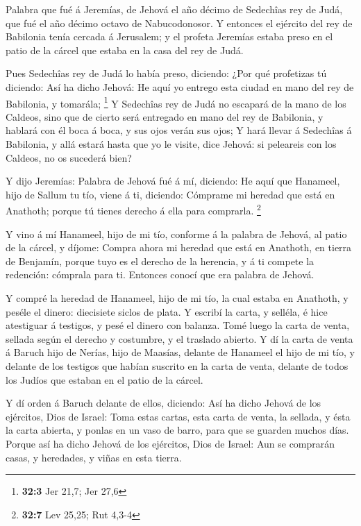  Palabra que fué á Jeremías, de Jehová el año décimo de
Sedechîas rey de Judá, que fué el año décimo octavo de Nabucodonosor.
 Y entonces el ejército del rey de Babilonia tenía cercada
á Jerusalem; y el profeta Jeremías estaba preso en el patio de la cárcel
que estaba en la casa del rey de Judá.

 Pues Sedechîas rey de Judá lo había preso, diciendo: ¿Por
qué profetizas tú diciendo: Así ha dicho Jehová: He aquí yo entrego esta
ciudad en mano del rey de Babilonia, y tomarála; \footnote{\textbf{32:3}
  Jer 21,7; Jer 27,6}  Y Sedechîas rey de Judá no escapará
de la mano de los Caldeos, sino que de cierto será entregado en mano del
rey de Babilonia, y hablará con él boca á boca, y sus ojos verán sus
ojos;  Y hará llevar á Sedechîas á Babilonia, y allá
estará hasta que yo le visite, dice Jehová: si peleareis con los
Caldeos, no os sucederá bien?

 Y dijo Jeremías: Palabra de Jehová fué á mí, diciendo:
 He aquí que Hanameel, hijo de Sallum tu tío, viene á ti,
diciendo: Cómprame mi heredad que está en Anathoth; porque tú tienes
derecho á ella para comprarla. \footnote{\textbf{32:7} Lev 25,25; Rut
  4,3-4}

 Y vino á mí Hanameel, hijo de mi tío, conforme á la
palabra de Jehová, al patio de la cárcel, y díjome: Compra ahora mi
heredad que está en Anathoth, en tierra de Benjamín, porque tuyo es el
derecho de la herencia, y á ti compete la redención: cómprala para ti.
Entonces conocí que era palabra de Jehová.

 Y compré la heredad de Hanameel, hijo de mi tío, la cual
estaba en Anathoth, y peséle el dinero: diecisiete siclos de plata.
 Y escribí la carta, y selléla, é hice atestiguar á
testigos, y pesé el dinero con balanza.  Tomé luego la
carta de venta, sellada según el derecho y costumbre, y el traslado
abierto.  Y dí la carta de venta á Baruch hijo de Nerías,
hijo de Maasías, delante de Hanameel el hijo de mi tío, y delante de los
testigos que habían suscrito en la carta de venta, delante de todos los
Judíos que estaban en el patio de la cárcel.

 Y dí orden á Baruch delante de ellos, diciendo:
 Así ha dicho Jehová de los ejércitos, Dios de Israel:
Toma estas cartas, esta carta de venta, la sellada, y ésta la carta
abierta, y ponlas en un vaso de barro, para que se guarden muchos días.
 Porque así ha dicho Jehová de los ejércitos, Dios de
Israel: Aun se comprarán casas, y heredades, y viñas en esta tierra.

